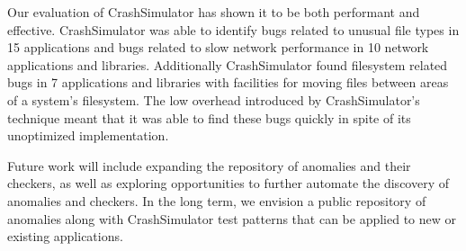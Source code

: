 Our evaluation of CrashSimulator has shown it to be both performant and
effective.  CrashSimulator was able to identify bugs related to unusual file
types in 15 applications and bugs related to slow network performance in 10
network applications and libraries.  Additionally CrashSimulator found
filesystem related bugs in 7 applications and libraries with facilities for
moving files between areas of a system's filesystem.  The low overhead
introduced by CrashSimulator's technique meant that it was able to
find these bugs quickly in spite of its unoptimized implementation.

Future work will include expanding the repository of anomalies and their
checkers, as well as exploring opportunities to further automate the discovery
of anomalies and checkers.  In the long term, we envision a public repository of
anomalies along with CrashSimulator test patterns that can be applied to new or
existing applications.
